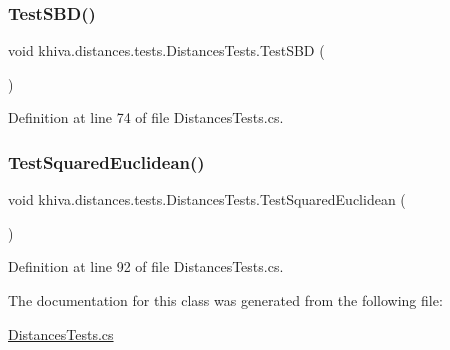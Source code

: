 \subsubsection{\texorpdfstring{Test\+S\+B\+D()}{TestSBD()}}
{\footnotesize\ttfamily void khiva.\+distances.\+tests.\+Distances\+Tests.\+Test\+S\+BD (\begin{DoxyParamCaption}{ }\end{DoxyParamCaption})\hspace{0.3cm}{\ttfamily [inline]}}



Definition at line 74 of file Distances\+Tests.\+cs.

\mbox{\label{classkhiva_1_1distances_1_1tests_1_1_distances_tests_a4a96ea1742672b33fa95a5dd0c8ab42b}} 
\subsubsection{\texorpdfstring{Test\+Squared\+Euclidean()}{TestSquaredEuclidean()}}
{\footnotesize\ttfamily void khiva.\+distances.\+tests.\+Distances\+Tests.\+Test\+Squared\+Euclidean (\begin{DoxyParamCaption}{ }\end{DoxyParamCaption})\hspace{0.3cm}{\ttfamily [inline]}}



Definition at line 92 of file Distances\+Tests.\+cs.



The documentation for this class was generated from the following file\+:\begin{DoxyCompactItemize}
\item 
\mbox{\hyperlink{_distances_tests_8cs}{Distances\+Tests.\+cs}}\end{DoxyCompactItemize}

